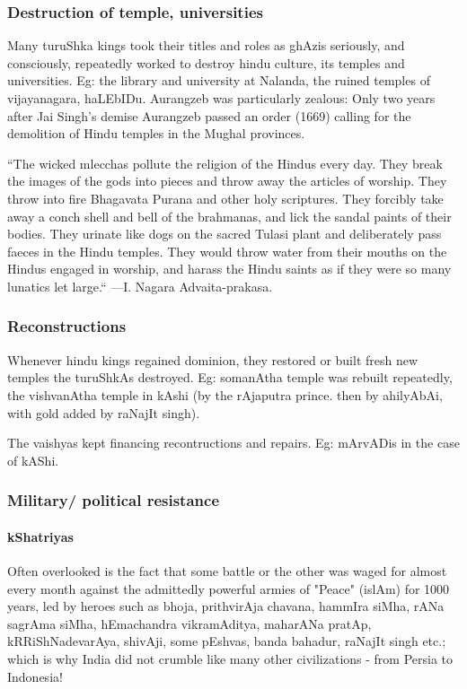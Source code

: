\documentclass[oneside, article]{memoir}
\begin{document}
\subsubsection{Destruction of temple, universities}
Many turuShka kings took their titles and roles as ghAzis seriously, and consciously, repeatedly worked to destroy hindu culture, its temples and universities. Eg: the library and university at Nalanda, the ruined temples of vijayanagara, haLEbIDu. Aurangzeb was particularly zealous: Only two years after Jai Singh's demise Aurangzeb passed an order (1669) calling for the demolition of Hindu temples in the Mughal provinces.

``The wicked mlecchas pollute the religion of the Hindus every day. They break the images of the gods into pieces and throw away the articles of worship. They throw into fire Bhagavata Purana and other holy scriptures. They forcibly take away a conch shell and bell of the brahmanas, and lick the sandal paints of their bodies. They urinate like dogs on the sacred Tulasi plant and deliberately pass faeces in the Hindu temples. They would throw water from their mouths on the Hindus engaged in worship, and harass the Hindu saints as if they were so many lunatics let large.`` —I. Nagara Advaita-prakasa.

\subsubsection{Reconstructions}
Whenever hindu kings regained dominion, they restored or built fresh new temples the turuShkAs destroyed. Eg: somanAtha temple was rebuilt repeatedly, the vishvanAtha temple in kAshi (by the rAjaputra prince. then by ahilyAbAi, with gold added by raNajIt singh).

The vaishyas kept financing recontructions and repairs. Eg: mArvADis in the case of kAShi.

\subsubsection{Military/ political resistance}
\paragraph{kShatriyas}
Often overlooked is the fact that some battle or the other was waged for almost every month against the admittedly powerful armies of "Peace" (islAm) for 1000 years, led by heroes such as bhoja, prithvirAja chavana, hammIra siMha, rANa sagrAma siMha, hEmachandra vikramAditya, maharANa pratAp, kRRiShNadevarAya, shivAji, some pEshvas, banda bahadur, raNajIt singh etc.; which is why India did not crumble like many other civilizations - from Persia to Indonesia!
\end{document}
